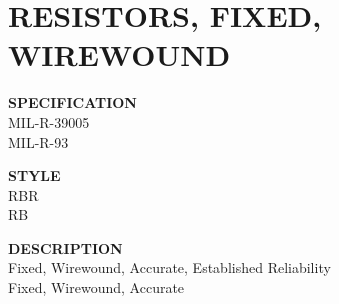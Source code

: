\section{RESISTORS, FIXED, WIREWOUND}

\begin{minipage}[t]{0.24\textwidth}
    \textbf{SPECIFICATION}\\
    MIL-R-39005\\MIL-R-93
\end{minipage}
\hfill
\begin{minipage}[t]{0.12\textwidth}
    \textbf{STYLE}\\
    RBR\\RB
\end{minipage}
\hfill
\begin{minipage}[t]{0.61\textwidth}
    \textbf{DESCRIPTION}\\
    Fixed, Wirewound, Accurate, Established Reliability\\Fixed, Wirewound, Accurate
\end{minipage}

